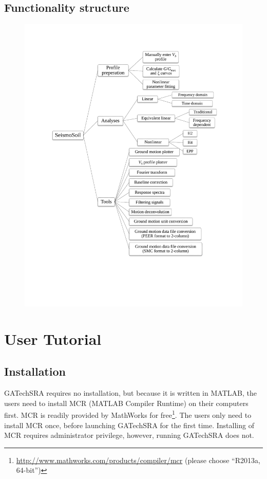 \documentclass[11pt,letterpaper]{article}
\begin{document}
\newpage
\subsection{Functionality structure}

\begin{figure}[H]
\centering
  \includegraphics[width=.99\textwidth]{functionality_structure.pdf}\\
\end{figure}

\section{User Tutorial}
\subsection{Installation}

GATechSRA requires no installation, but because it is written in MATLAB, the users need to install MCR (MATLAB Compiler Runtime) on their computers first. MCR is readily provided by MathWorks for free\footnote{\href{http://www.mathworks.com/products/compiler/mcr}{\textsf{http://www.mathworks.com/products/compiler/mcr}} (please choose ``R2013a, 64-bit'')}. The users only need to install MCR once, before launching GATechSRA for the first time. Installing of MCR requires administrator privilege, however, running GATechSRA does not.
\end{document}
